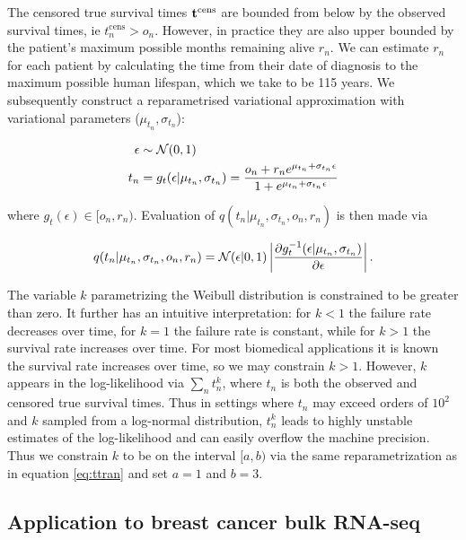 The censored true survival times $\mathbf{t}^{\text{cens}}$ are bounded from below by the observed survival times, ie $t_n^{\text{cens}} > o_n$. However, in practice they are also upper bounded by the patient's maximum possible months remaining alive $r_n$. We can estimate $r_n$ for each patient by calculating the time from their date of diagnosis to the maximum possible human lifespan,  which we take to be 115 years. We subsequently construct a reparametrised variational approximation with variational parameters ($\mu_{t_n}, \sigma_{t_n}$):

\begin{equation} \label{eq:ttran}
  \begin{aligned}
  \epsilon & \sim \mathcal{N}(0, 1) \\
   t_n & = g_t(\epsilon | \mu_{t_n}, \sigma_{t_n}) = \frac{o_n + r_n e^{\mu_{t_n} + \sigma_{t_n} \epsilon}}{1 + e^{\mu_{t_n} + \sigma_{t_n}\epsilon}}
  \end{aligned}
\end{equation}

where $g_t(\epsilon) \in [o_n, r_n)$. 
Evaluation of $q(t_n | \mu_{t_n}, \sigma_{t_n}, o_n, r_n)$ is then made via 

\begin{equation}
q(t_n | \mu_{t_n}, \sigma_{t_n}, o_n, r_n) = \mathcal{N}(\epsilon | 0, 1) \left| \frac{\partial g^{-1}_t(\epsilon | \mu_{t_n}, \sigma_{t_n})}{\partial \epsilon} \right|.
\end{equation}

The variable $k$ parametrizing the Weibull distribution is constrained to be greater than zero. It further has an intuitive interpretation: for $k < 1$ the failure rate decreases over time, for $k = 1$ the failure rate is constant, while for $k > 1$ the survival rate increases over time. For most biomedical applications it is known the survival rate increases over time, so we may constrain $k > 1$. However, $k$ appears in the log-likelihood via $\sum_n t_n^k$, where $t_n$ is both the observed and censored true survival times. Thus in settings where $t_n$ may exceed orders of $10^2$ and $k$ sampled from a log-normal distribution, $t_n^k$ leads to highly unstable estimates of the log-likelihood and can easily overflow the machine precision. Thus we constrain $k$ to be on the interval $[a, b)$ via the same reparametrization as in equation \ref{eq:ttran} and  set $a = 1$ and $b = 3$.


\subsection{Application to breast cancer bulk RNA-seq}


